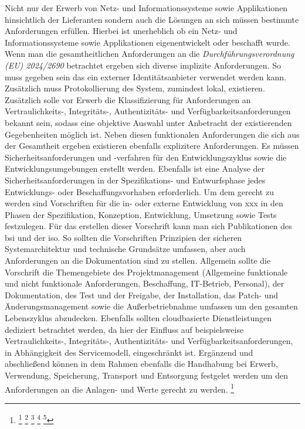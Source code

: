 \documentclass[11pt,a4paper,hidelinks]{article}   %
\begin{document}
            Nicht nur der Erwerb von Netz- und Informationssysteme sowie Applikationen hinsichtlich der Lieferanten sondern auch die Lösungen an sich müssen bestimmte Anforderungen erfüllen. Hierbei ist unerheblich ob ein Netz- und Informationssysteme sowie Applikationen eigenentwickelt oder beschafft wurde. Wenn man die gesamtheitlichen Anforderungen an die \emph{Durchführungsverordnung (EU) 2024/2690} betrachtet ergeben sich diverse implizite Anforderungen. So muss gegeben sein das ein externer Identitätsanbieter verwendet werden kann. Zusätzlich muss Protokollierung des System, zumindest lokal, existieren. Zusätzlich solle vor Erwerb die Klassifizierung für Anforderungen an Vertraulichkeits-, Integritäts-, Authentizitäts- und Verfügbarkeitsanforderungen bekannt sein, sodass eine objektive Auswahl unter Anbetracht der existierenden Gegebenheiten möglich ist. Neben diesen funktionalen Anforderungen die sich aus der Gesamtheit ergeben existieren ebenfalls explizitere Anforderungen. Es müssen Sicherheitsanforderungen und -verfahren für den Entwicklungszyklus sowie die Entwicklungsumgebungen erstellt werden. Ebenfalls ist eine Analyse der Sicherheitsanforderungen in der Spezifikations- und Entwurfsphase jedes Entwicklungs- oder Beschaffungsvorhaben erforderlich. Um dem gerecht zu werden sind Vorschriften für die in- oder externe Entwicklung von xxx in den Phasen der Spezifikation, Konzeption, Entwicklung, Umsetzung sowie Tests festzulegen. Für das erstellen dieser Vorschrift kann man sich Publikationen des \gls{bsi} und der \gls{iso}. So sollten die Vorschriften Prinzipien der sicheren Systemarchitektur und technische Grundsätze umfassen, aber auch Anforderungen an die Dokumentation sind zu stellen. Allgemein sollte die Vorschrift die Themengebiete des Projektmanagement (Allgemeine funktionale und nicht funktionale Anforderungen, Beschaffung, IT-Betrieb, Personal), der Dokumentation, des Test und der Freigabe, der Installation, das Patch- und Änderungsmanagement sowie die Außerbetriebnahme umfassen um den gesamten Lebenszyklus abzudecken. Ebenfalls sollten cloudbasierte Dienstleistungen dediziert betrachtet werden, da hier der Einfluss auf beispielsweise Vertraulichkeits-, Integritäts-, Authentizitäts- und Verfügbarkeitsanforderungen, in Abhängigkeit des Servicemodell, eingeschränkt ist. Ergänzend und abschließend können in dem Rahmen ebenfalls die Handhabung bei Erwerb, Verwendung, Speicherung, Transport und Entsorgung festgelet werden um den Anforderungen an die Anlagen- und Werte gerecht zu werden.
            \footnote{
                \footcite[Vgl. S. 369][]{9783864900921}
                \footcite[Vgl. S. 10][]{bsi:1a3676}
                \footcite[Vgl. S. 10 - 11, 13][]{bsi:e8b2b1}
                \footcite[][8.26, 8.27]{iso27002-2022}
                \footcite[Vgl. S. 6, 9 - 12][]{bsi:8ca4cc}
            }
\end{document}
